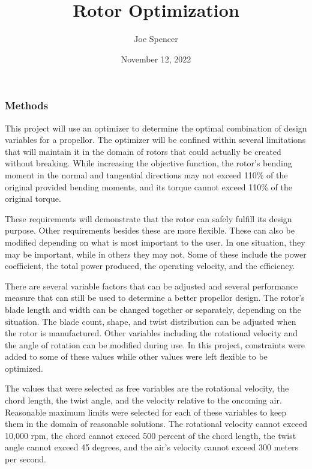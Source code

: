 \documentclass{article}
\begin{document}
\author{Joe Spencer}
\title{Rotor Optimization}
\date{November 12, 2022}
\maketitle

\subsubsection*{Methods}

This project will use an optimizer to determine the optimal combination of design variables for a propellor. The optimizer will be confined within several limitations that will maintain it in the domain of rotors that could actually be created without breaking. While increasing the objective function, the rotor's bending moment in the normal and tangential directions may not exceed 110\% of the original provided bending moments, and its torque cannot exceed 110\% of the original torque. \newline

These requirements will demonstrate that the rotor can safely fulfill its design purpose. Other requirements besides these are more flexible. These can also be modified depending on what is most important to the user. In one situation, they may be important, while in others they may not. Some of these include the power coefficient, the total power produced, the operating velocity, and the efficiency. \newline

There are several variable factors that can be adjusted and several performance measure that can still be used to determine a better propellor design. The rotor's blade length and width can be changed together or separately, depending on the situation. The blade count, shape, and twist distribution can be adjusted when the rotor is manufactured. Other variables including the rotational velocity and the angle of rotation can be modified during use. In this project, constraints were added to some of these values while other values were left flexible to be optimized. \newline

The values that were selected as free variables are the rotational velocity, the chord length, the twist angle, and the velocity relative to the oncoming air. Reasonable maximum limits were selected for each of these variables to keep them in the domain of reasonable solutions. The rotational velocity cannot exceed 10,000 rpm, the chord cannot exceed 500 percent of the chord length, the twist angle cannot exceed 45 degrees, and the air's velocity cannot exceed 300 meters per second. \newline
\end{document}
